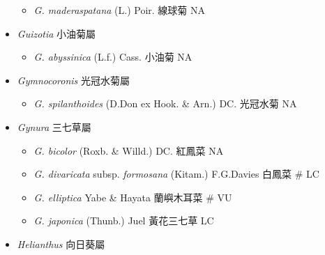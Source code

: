 \begin{itemize}
  \begin{itemize}
        \item[] \textit{G. maderaspatana} (L.) Poir.  線球菊   NA
  \end{itemize}
 \item[] \textit{Guizotia} 小油菊屬
                                
  \begin{itemize}
        \item[] \textit{G. abyssinica} (L.f.) Cass.  小油菊   NA
  \end{itemize}
 \item[] \textit{Gymnocoronis} 光冠水菊屬
                                
  \begin{itemize}
        \item[] \textit{G. spilanthoides} (D.Don ex Hook. \& Arn.) DC.  光冠水菊   NA
  \end{itemize}
 \item[] \textit{Gynura} 三七草屬
                                
  \begin{itemize}
        \item[] \textit{G. bicolor} (Roxb. \& Willd.) DC.  紅鳳菜   NA
        \item[] \textit{G. divaricata} subsp. \textit{formosana} (Kitam.) F.G.Davies  白鳳菜  \# LC
        \item[] \textit{G. elliptica} Yabe \& Hayata  蘭嶼木耳菜  \# VU
        \item[] \textit{G. japonica} (Thunb.) Juel  黃花三七草   LC
  \end{itemize}
 \item[] \textit{Helianthus} 向日葵屬
                                

\end{itemize}
